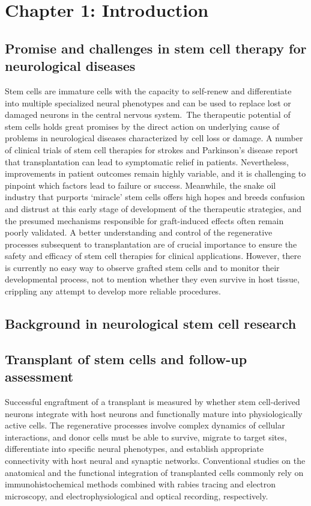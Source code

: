 \newpage
\section{Chapter 1: Introduction}

\subsection{Promise and challenges in stem cell  therapy for neurological diseases}

Stem cells  are immature cells with the capacity to self-renew and differentiate into  multiple specialized neural phenotypes and can be used to replace lost or  damaged neurons in the central nervous system. The therapeutic potential of stem cells  holds great promises by the direct action on underlying cause of problems in  neurological diseases characterized by cell loss or damage. A number of clinical trials of stem cell therapies for strokes  and Parkinson's disease report that transplantation can lead to symptomatic  relief in patients. Nevertheless, improvements in patient outcomes remain  highly variable, and it is challenging to pinpoint which factors lead to  failure or success. Meanwhile, the snake oil industry that purports ‘miracle’  stem cells offers high hopes and breeds confusion and distrust at this early  stage of development of the therapeutic strategies, and the presumed mechanisms  responsible for graft-induced effects often remain poorly validated. A better  understanding and control of the regenerative processes subsequent to  transplantation are of crucial importance to ensure the safety and efficacy of  stem cell therapies for clinical applications. However, there is currently no  easy way to observe grafted stem cells and to monitor their developmental  process, not to mention whether they even survive in host tissue, crippling any  attempt to develop more reliable procedures.

\subsection{Background in neurological stem cell  research}

\subsection{Transplant of stem cells and follow-up assessment}

Successful  engraftment of a transplant is measured by whether stem cell-derived neurons  integrate with host neurons and functionally mature into physiologically active  cells. The regenerative processes involve complex dynamics of cellular  interactions, and donor cells must be able to survive, migrate to target sites,  differentiate into specific neural phenotypes, and establish appropriate  connectivity with host neural and synaptic networks. Conventional studies on  the anatomical and the functional integration of transplanted cells commonly  rely on immunohistochemical methods combined with rabies tracing and electron  microscopy, and electrophysiological and optical recording, respectively. 

